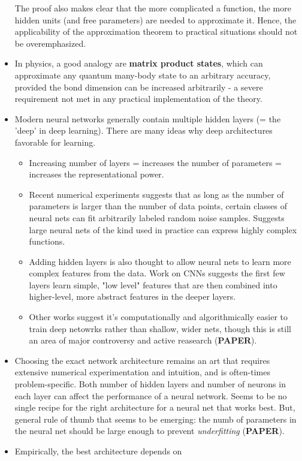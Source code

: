 \documentclass[norsk,a4paper,11pt]{article}
\begin{document}
\begin{itemize}
	The proof also makes clear that the more complicated a function, the more hidden units (and free parameters) are needed to approximate it. Hence, the applicability of the approximation theorem to practical situations should not be overemphasized.
	\item In physics, a good analogy are \textbf{matrix product states}, which can approximate any quantum many-body state to an arbitrary accuracy, provided the bond dimension can be increased arbitrarily - a severe requirement not met in any practical implementation of the theory.
	\item Modern neural networks generally contain multiple hidden layers (= the 'deep' in deep learning). There are many ideas why deep architectures favorable for learning.
	\begin{itemize}
		\item Increasing number of layers = increases the number of parameters = increases the representational power.
		\item Recent numerical experiments suggests that as long as the number of parameters is larger than the number of data points, certain classes of neural nets can fit arbitrarily labeled random noise samples. Suggests large neural nets of the kind used in practice can express highly complex functions.
		\item Adding hidden layers is also thought to allow neural nets to learn more complex features from the data. Work on CNNs suggests the first few layers learn simple, "low level" features that are then combined into higher-level, more abstract features in the deeper layers.
		\item Other works suggest it's computationally and algorithmically easier to train deep netowrks rather than shallow, wider nets, though this is still an area of major controversy and active reasearch (\textbf{PAPER}). 
	\end{itemize}
	\item Choosing the exact network architecture remains an art that requires extensive numerical experimentation and intuition, and is often-times problem-specific. Both number of hidden layers and number of neurons in each layer can affect the performance of a neural network. Seems to be no single recipe for the right architecture for a neural net that works best. But, general rule of thumb that seems to be emerging: the numb of parameters in the neural net should be large enough to prevent \textit{underfitting} (\textbf{PAPER}).
	\item Empirically, the best architecture depends on

\end{itemize}
\end{document}
